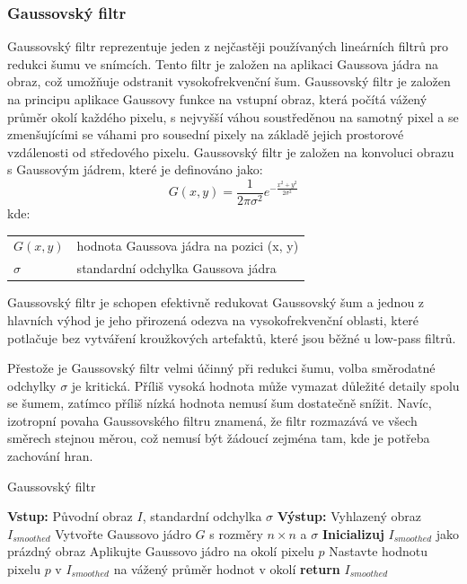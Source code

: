 \documentclass[male,czech,api_ing]{thesis}
\makeatletter
\newenvironment{conditions}[1][kde:]
    {#1 \begin{tabular}[t]{>{$}l<{$} @{${}={}$} >{\raggedright\arraybackslash}p{10cm}}}
    {\end{tabular}}
\makeatother
\begin{document}
\subsubsection{Gaussovský filtr}
Gaussovský filtr reprezentuje jeden z nejčastěji používaných lineárních filtrů pro redukci šumu ve snímcích. Tento filtr je založen na aplikaci Gaussova jádra na obraz, což umožňuje odstranit vysokofrekvenční šum. Gaussovský filtr je založen na principu aplikace Gaussovy funkce na vstupní obraz, která počítá vážený průměr okolí každého pixelu, s nejvyšší váhou soustředěnou na samotný pixel a se zmenšujícími se váhami pro sousední pixely na základě jejich prostorové vzdálenosti od středového pixelu. Gaussovský filtr je založen na konvoluci obrazu s Gaussovým jádrem, které je definováno jako:
\begin{equation}
    G(x, y) = \frac{1}{2\pi\sigma^2} e^{-\frac{x^2 + y^2}{2\sigma^2}}
\end{equation}
\begin{conditions}
    G(x, y) & hodnota Gaussova jádra na pozici (x, y) \\
    \sigma & standardní odchylka Gaussova jádra
\end{conditions}

Gaussovský filtr je schopen efektivně redukovat Gaussovský šum a jednou z hlavních výhod je jeho přirozená odezva na vysokofrekvenční oblasti, které potlačuje bez vytváření kroužkových artefaktů, které jsou běžné u low-pass filtrů.

Přestože je Gaussovský filtr velmi účinný při redukci šumu, volba směrodatné odchylky $\sigma$ je kritická. Příliš vysoká hodnota může vymazat důležité detaily spolu se šumem, zatímco příliš nízká hodnota nemusí šum dostatečně snížit. Navíc, izotropní povaha Gaussovského filtru znamená, že filtr rozmazává ve všech směrech stejnou měrou, což nemusí být žádoucí zejména tam, kde je potřeba zachování hran. \cite{XRayImageProcessing}

\begin{algorithm}
    \caption{Gaussovský filtr}
    \begin{algorithmic}[1]
        \State \textbf{Vstup:} Původní obraz $I$, standardní odchylka $\sigma$
        \State \textbf{Výstup:} Vyhlazený obraz $I_{smoothed}$
        \State Vytvořte Gaussovo jádro $G$ s rozměry $n \times n$ a $\sigma$
        \State \textbf{Inicializuj} $I_{smoothed}$ jako prázdný obraz
            \State Aplikujte Gaussovo jádro na okolí pixelu $p$
            \State Nastavte hodnotu pixelu $p$ v $I_{smoothed}$ na vážený průměr hodnot v okolí
        \EndFor
        \State \textbf{return} $I_{smoothed}$
    \end{algorithmic}
\end{algorithm}
\end{document}
